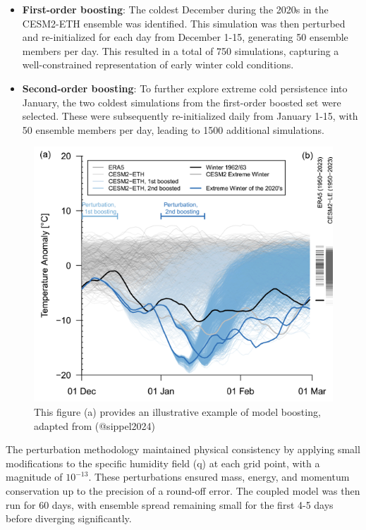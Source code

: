 \documentclass[
]{krantz}
\providecommand{\tightlist}{%
  \setlength{\itemsep}{0pt}\setlength{\parskip}{0pt}}
\begin{document}
\begin{itemize}
\tightlist
\item
  \textbf{First-order boosting}: The coldest December during the 2020s in the CESM2-ETH ensemble was identified. This simulation was then perturbed and re-initialized for each day from December 1-15, generating 50 ensemble members per day. This resulted in a total of 750 simulations, capturing a well-constrained representation of early winter cold conditions.
\item
  \textbf{Second-order boosting}: To further explore extreme cold persistence into January, the two coldest simulations from the first-order boosted set were selected. These were subsequently re-initialized daily from January 1-15, with 50 ensemble members per day, leading to 1500 additional simulations.
\end{itemize}

\begin{figure}

{\centering \includegraphics[width=0.7\linewidth]{work/03-coldex/figures/boosting_original} 

}

\caption{This figure (a) provides an illustrative example of model boosting, adapted from (@sippel2024)}\label{fig:boosting-example}
\end{figure}

The perturbation methodology maintained physical consistency by applying small modifications to the specific humidity field (q) at each grid point, with a magnitude of \(10^{-13}\). These perturbations ensured mass, energy, and momentum conservation up to the precision of a round-off error. The coupled model was then run for 60 days, with ensemble spread remaining small for the first 4-5 days before diverging significantly.
\end{document}
